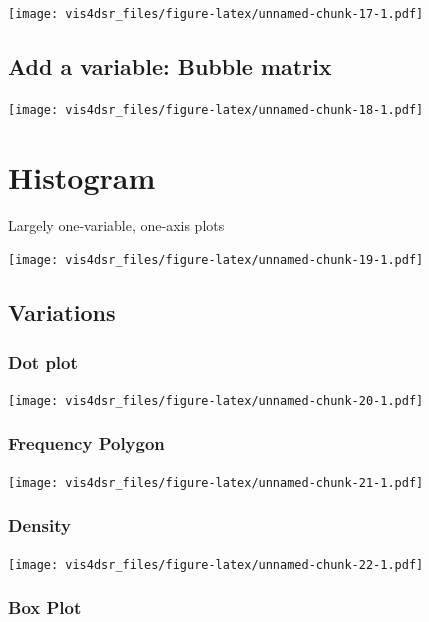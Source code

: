 \documentclass[
]{krantz}
\begin{document}
\texttt{[image: vis4dsr\_files/figure-latex/unnamed-chunk-17-1.pdf]}

\hypertarget{add-a-variable-bubble-matrix}{%
\subsection{Add a variable: Bubble matrix}\label{add-a-variable-bubble-matrix}}

\texttt{[image: vis4dsr\_files/figure-latex/unnamed-chunk-18-1.pdf]}

\hypertarget{histogram}{%
\section{Histogram}\label{histogram}}

Largely one-variable, one-axis plots

\texttt{[image: vis4dsr\_files/figure-latex/unnamed-chunk-19-1.pdf]}

\hypertarget{variations-5}{%
\subsection{Variations}\label{variations-5}}

\hypertarget{dot-plot}{%
\subsubsection{Dot plot}\label{dot-plot}}

\texttt{[image: vis4dsr\_files/figure-latex/unnamed-chunk-20-1.pdf]}

\hypertarget{frequency-polygon}{%
\subsubsection{Frequency Polygon}\label{frequency-polygon}}

\texttt{[image: vis4dsr\_files/figure-latex/unnamed-chunk-21-1.pdf]}

\hypertarget{density}{%
\subsubsection{Density}\label{density}}

\texttt{[image: vis4dsr\_files/figure-latex/unnamed-chunk-22-1.pdf]}

\hypertarget{box-plot}{%
\subsubsection{Box Plot}\label{box-plot}}
\end{document}

